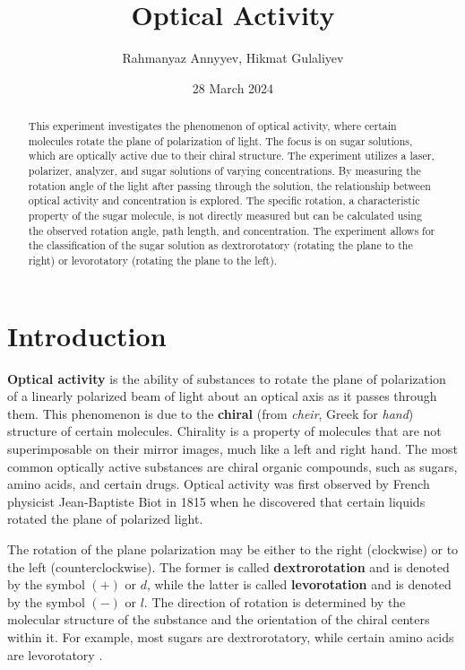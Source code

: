 \documentclass[10pt]{article}
\title{Optical Activity}
\author{Rahmanyaz Annyyev, Hikmat Gulaliyev}
\date{28 March 2024}
\begin{document}
\maketitle

\begin{abstract}

This experiment investigates the phenomenon of optical activity, where certain molecules rotate the plane of polarization of light. The focus is on sugar solutions, which are optically active due to their chiral structure. The experiment utilizes a laser, polarizer, analyzer, and sugar solutions of varying concentrations. By measuring the rotation angle of the light after passing through the solution, the relationship between optical activity and concentration is explored. The specific rotation, a characteristic property of the sugar molecule, is not directly measured but can be calculated using the observed rotation angle, path length, and concentration. The experiment allows for the classification of the sugar solution as dextrorotatory (rotating the plane to the right) or levorotatory (rotating the plane to the left).

\end{abstract}

\section{Introduction}

\textbf{Optical activity} is the ability of substances to rotate the plane of polarization of a linearly polarized beam of light about an optical axis as it passes through them. This phenomenon is due to the \textbf{chiral} (from \textit{cheir}, Greek for \textit{hand}) structure of certain molecules. Chirality is a property of molecules that are not superimposable on their mirror images, much like a left and right hand. The most common optically active substances are chiral organic compounds, such as sugars, amino acids, and certain drugs. Optical activity was first observed by French physicist Jean-Baptiste Biot in 1815 when he discovered that certain liquids rotated the plane of polarized light.

The rotation of the plane polarization may be either to the right (clockwise) or to the left (counterclockwise). The former is called \textbf{dextrorotation} and is denoted by the symbol $(+)$ or $d$, while the latter is called \textbf{levorotation} and is denoted by the symbol $(-)$ or $l$. The direction of rotation is determined by the molecular structure of the substance and the orientation of the chiral centers within it. For example, most sugars are dextrorotatory, while certain amino acids are levorotatory \cite{Petrucci_2017}.
\end{document}
